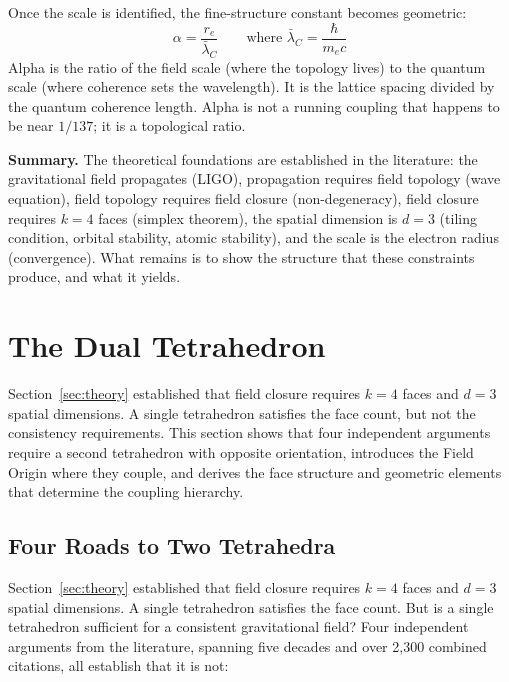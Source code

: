 \documentclass[aps,prd,preprint,superscriptaddress,showpacs,preprintnumbers,amsmath,amssymb,nofootinbib]{revtex4-2}
\begin{document}
Once the scale is identified, the fine-structure constant becomes geometric:
\begin{equation}
\alpha = \frac{r_e}{\bar{\lambda}_C} \qquad \text{where } \bar{\lambda}_C = \frac{\hbar}{m_e c}
\end{equation}
Alpha is the ratio of the field scale (where the topology lives) to the quantum scale (where coherence sets the wavelength). It is the lattice spacing divided by the quantum coherence length. Alpha is not a running coupling that happens to be near $1/137$; it is a topological ratio.

\vspace{1em}
\noindent\textbf{Summary.} The theoretical foundations are established in the literature: the gravitational field propagates (LIGO), propagation requires field topology (wave equation), field topology requires field closure (non-degeneracy), field closure requires $k = 4$ faces (simplex theorem), the spatial dimension is $d = 3$ (tiling condition, orbital stability, atomic stability), and the scale is the electron radius (convergence). What remains is to show the structure that these constraints produce, and what it yields.

\section{The Dual Tetrahedron}
\label{sec:foundation}

Section~\ref{sec:theory} established that field closure requires $k = 4$ faces and $d = 3$ spatial dimensions. A single tetrahedron satisfies the face count, but not the consistency requirements. This section shows that four independent arguments require a second tetrahedron with opposite orientation, introduces the Field Origin where they couple, and derives the face structure and geometric elements that determine the coupling hierarchy.

\subsection{Four Roads to Two Tetrahedra}
\label{subsec:two-tet}

Section~\ref{sec:theory} established that field closure requires $k = 4$ faces and $d = 3$ spatial dimensions. A single tetrahedron satisfies the face count. But is a single tetrahedron sufficient for a consistent gravitational field? Four independent arguments from the literature, spanning five decades and over 2,300 combined citations, all establish that it is not:
\end{document}
